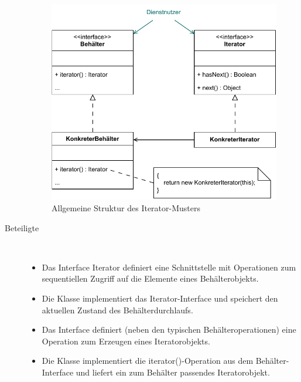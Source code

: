 \begin{description}
	\begin{figure}[h!]
		\centering
		\includegraphics[scale=1.0]{Bilder/Kapitel-10/muster_iterator.pdf}
		\caption{Allgemeine Struktur des Iterator-Musters}
		\label{fig:muster_iterator}
	\end{figure}

	\item[Beteiligte] ~
	\begin{itemize}
		\item 	Das Interface Iterator definiert eine Schnittstelle mit Operationen zum sequentiellen Zugriff auf die Elemente eines Behälterobjekts.
		\item 	Die Klasse  implementiert das Iterator-Interface und speichert den aktuellen Zustand des Behälterdurchlaufs.
		\item 	Das Interface  definiert (neben den typischen Behälteropera\-tionen) eine Operation zum Erzeugen eines Iteratorobjekts.
		\item 	Die Klasse  implementiert die iterator()-Operation aus dem Behälter-Interface und liefert ein zum Behälter passendes 
		\linebreak %
		Iteratorobjekt.
	\end{itemize}
	

\end{description}
